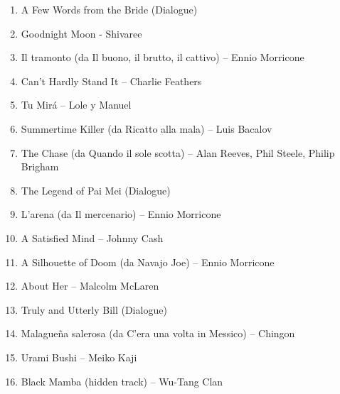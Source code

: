 \documentclass[12pt]{article} %
\begin{document}
                \begin{enumerate}
                    \item A Few Words from the Bride (Dialogue)
                    \item Goodnight Moon - Shivaree
                    \item Il tramonto (da Il buono, il brutto, il cattivo) – Ennio Morricone
                    \item Can't Hardly Stand It – Charlie Feathers
                    \item Tu Mirá – Lole y Manuel
                    \item Summertime Killer (da Ricatto alla mala) – Luis Bacalov
                    \item The Chase (da Quando il sole scotta) – Alan Reeves, Phil Steele, Philip Brigham
                    \item The Legend of Pai Mei (Dialogue)
                    \item L'arena (da Il mercenario) – Ennio Morricone
                    \item A Satisfied Mind – Johnny Cash
                    \item A Silhouette of Doom (da Navajo Joe) – Ennio Morricone
                    \item About Her – Malcolm McLaren
                    \item Truly and Utterly Bill (Dialogue)
                    \item Malagueña salerosa (da C'era una volta in Messico) – Chingon
                    \item Urami Bushi – Meiko Kaji
                    \item Black Mamba (hidden track) – Wu-Tang Clan
                \end{enumerate}

                \normalsize
\end{document}

